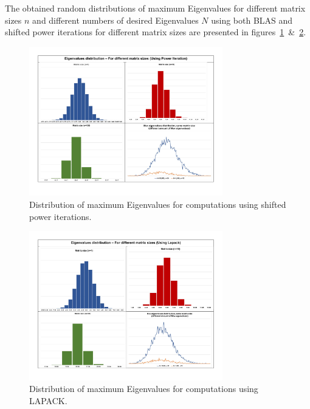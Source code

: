 \documentclass[11pt, oneside]{article}
\begin{document}
The obtained random distributions of maximum Eigenvalues for different matrix sizes $n$ and different numbers of desired Eigenvalues $N$ using both BLAS and shifted power iterations for different matrix sizes are presented in figures~\ref{fig:1}~\&~\ref{fig:2}.
        \begin{figure}[h]
		\centering
		\includegraphics[width=0.75\textwidth]{Figures/D_power.pdf}
		\caption{Distribution of maximum Eigenvalues for computations using shifted power iterations.}
		\label{fig:1}
	\end{figure}
	\begin{figure}[h]
		\centering
		\includegraphics[width=0.75\textwidth]{Figures/D_Lapack.pdf}
		\caption{Distribution of maximum Eigenvalues for computations using LAPACK.}
		\label{fig:2}
	\end{figure}
\end{document}
